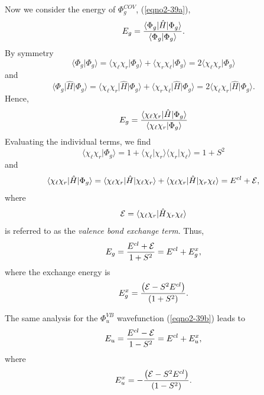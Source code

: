 Now we consider the energy of $\Phi^{COV}_g$, (\ref{eqno2-39a}),
\begin{equation}
E_g = {\langle \Phi_g \vert {\hat H} \vert \Phi_g \rangle \over 
\langle \Phi_g \vert \Phi_g \rangle} .
\end{equation}
By symmetry
\begin{equation}
\langle \Phi_g \vert \Phi_g \rangle = \langle \chi_\ell \chi_r \vert 
\Phi_g \rangle + \langle \chi_r \chi_\ell \vert \Phi_g \rangle = 2 
\langle \chi_\ell \chi_r \vert \Phi_g \rangle
\end{equation}
and
\begin{equation}
\langle \Phi_g \vert {\hat H} \vert \Phi_g \rangle = \langle \chi_\ell 
\chi_r \vert {\hat H} \vert \Phi_g \rangle + \langle \chi_r \chi_\ell 
\vert {\hat H} \vert \Phi_g \rangle = 2 \langle \chi_\ell \chi_r \vert 
{\hat H} \vert \Phi_g \rangle .
\end{equation}
Hence,
\begin{equation}
E_g = {\langle \chi_\ell \chi_r \vert {\hat H} \vert \Phi_g \rangle 
\over \langle \chi_\ell \chi_r \vert \Phi_g \rangle}
\end{equation}
Evaluating the individual terms, we find
\begin{equation}
\langle \chi_\ell \chi_r \vert \Phi_g \rangle = 1 + \langle \chi_\ell 
\vert \chi_r \rangle \langle \chi_r \vert \chi_\ell \rangle = 1 + S^2
\end{equation}
and
\begin{equation}
\langle \chi_\ell \chi_r \vert {\hat H} \vert \Phi_g \rangle = \langle 
\chi_\ell \chi_r \vert {\hat H} \vert \chi_\ell \chi_r \rangle + \langle 
\chi_\ell \chi_r \vert {\hat H} \vert \chi_r \chi_\ell \rangle = E^{cl} + 
{\cal E},
\end{equation}
where
\begin{equation}
{\cal E} = \langle \chi_\ell \chi_r \vert {\hat H} \chi_r \chi_\ell 
\rangle
\label{eqno2-44}
\end{equation}
is referred to as the \emph{valence bond exchange term}. Thus,
\begin{equation}
E_g = {E^{cl} + {\cal E} \over 1 + S^2} = E^{cl} + E^x_g ,
\end{equation}
where the exchange energy is
\begin{equation}
E^x_g = {\left( {\cal E} - S^2 E^{cl} \right) \over \left( 1 + 
S^2 \right)} .
\end{equation}
   
The same analysis for the $\Phi^{VB}_u$ wavefunction (\ref{eqno2-39b})
leads to
\begin{equation}
E_u = {E^{cl} - {\cal E} \over 1 - S^2} = E^{cl} + E^x_u ,
\end{equation}
where
\begin{equation}
E^x_u = - {\left( {\cal E} - S^2 E^{cl} \right) \over ( 1 - S^2 )} .
\end{equation}

